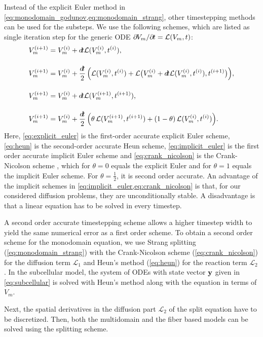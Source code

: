 Instead of the explicit Euler method in \cref{eq:monodomain_godunov,eq:monodomain_strang}, other timestepping methods can be used for the substeps. 
We use the following schemes, which are listed as single iteration step for the generic ODE ${\p V_m / \p t = \mathcal{L}(V_m,t)}$:
\begin{subequations}
  \begin{align}
    V_m^{(i+1)} &= V_m^{(i)} + \dt \mathcal{L}(V_m^{(i)},t^{(i)}), \label{eq:explicit_euler}\\[4mm]
    V_m^{(i+1)} &= V_m^{(i)} + \dfrac{\dt}{2}\Big(
      \mathcal{L}(V_m^{(i)},t^{(i)}) + \mathcal{L}\big(V_m^{(i)} + \dt \mathcal{L}(V_m^{(i)},t^{(i)}),t^{(i+1)}\big)\Big), \label{eq:heun}\\[4mm]
    V_m^{(i+1)} &= V_m^{(i)} + \dt \mathcal{L}(V_m^{(i+1)},t^{(i+1)}), \label{eq:implicit_euler}\\[4mm]
    V_m^{(i+1)} &= V_m^{(i)} + \dfrac{\dt}{2}\Big(
      \theta\,\mathcal{L}(V_m^{(i+1)},t^{(i+1)}) + (1-\theta)\,\mathcal{L}(V_m^{(i)},t^{(i)})\Big).\label{eq:crank_nicolson}
  \end{align}
\end{subequations}
%
Here, \cref{eq:explicit_euler} is the first-order accurate explicit Euler scheme, \cref{eq:heun} is the second-order accurate Heun scheme, \cref{eq:implicit_euler} is the first order accurate implicit Euler scheme and \cref{eq:crank_nicolson} is the Crank-Nicolson scheme \cite{CrankNicolson1947}, which for $\theta=0$ equals the explicit Euler and for $\theta=1$ equals the implicit Euler scheme. For $\theta=\frac12$, it is second order accurate. An advantage of the implicit schemes in \cref{eq:implicit_euler,eq:crank_nicolson} is that, for our considered diffusion problems, they are unconditionally stable. A disadvantage is that a linear equation has to be solved in every timestep.

A second order accurate timestepping scheme allows a higher timestep width to yield the same numerical error as a first order scheme.
To obtain a second order scheme for the monodomain equation, we use Strang splitting (\cref{eq:monodomain_strang}) with the Crank-Nicolson scheme (\cref{eq:crank_nicolson}) for the diffusion term $\mathcal{L}_1$ and Heun's method (\cref{eq:heun}) for the reaction term $\mathcal{L}_2$. In the subcellular model, the system of ODEs with state vector $\textbf{y}$ given in \cref{eq:subcellular} is solved with Heun's method along with the equation in terms of $V_m$.

Next, the spatial derivatives in the diffusion part $\mathcal{L}_2$ of the split equation have to be discretized. Then, both the multidomain and the fiber based models can be solved using the splitting scheme.

